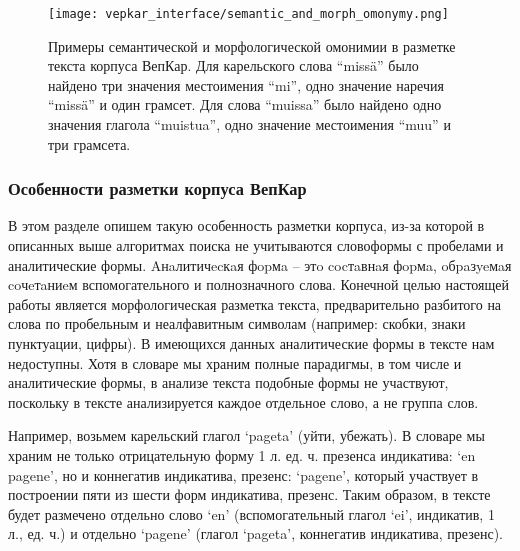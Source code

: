 \begin{figure}
    \centering
    \texttt{[image: vepkar\_interface/semantic\_and\_morph\_omonymy.png]}
   \caption[Примеры семантической и морфологической омонимии в разметке текста корпуса ВепКар]{Примеры семантической и морфологической омонимии  в разметке текста корпуса ВепКар. 
Для карельского слова “missä” было найдено три значения местоимения “mi”, одно значение наречия “missä” и один грамсет. Для слова “muissa” было найдено одно значения глагола “muistua”, одно значение местоимения “muu” и три грамсета.} 
   \label{fig:semantic_and_morph_omonymy}
\end{figure}
 
\subsubsection{Особенности разметки корпуса ВепКар}\label{corpus_peculiarities}
В этом разделе опишем такую особенность разметки корпуса, из-за которой в описанных выше алгоритмах поиска не учитываются словоформы с пробелами и аналитические формы.
Aнaлитичecкaя фopмa – этo cocтaвнaя фopмa, oбpaзyeмaя coчeтaниeм вспомогательного и полнозначного слова.
Конечной целью настоящей работы является морфологическая разметка текста, предварительно разбитого на слова по пробельным и неалфавитным символам (например: скобки, знаки пунктуации, цифры). 
В имеющихся данных аналитические формы в тексте нам недоступны. 
Хотя в словаре мы храним полные парадигмы, в том числе и аналитические формы, в анализе текста подобные формы не участвуют, поскольку в тексте анализируется каждое отдельное слово, а не группа слов. 

Например, возьмем карельский глагол ‘pageta’ (уйти, убежать).
В словаре мы храним не только отрицательную форму 1 л. ед. ч. презенса индикатива: ‘en pagene’, но и коннегатив индикатива, презенс: ‘pagene’, который участвует в построении пяти из шести форм индикатива, презенс. 
Таким образом, в тексте будет размечено отдельно слово ‘en’ (вспомогательный глагол ‘ei’, индикатив, 1 л., ед. ч.) и отдельно ‘pagene’ (глагол ‘pageta’, коннегатив индикатива, презенс).
